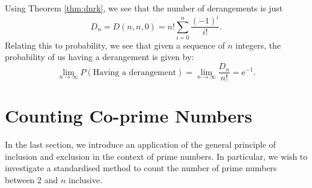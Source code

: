\documentclass[math]{amznotes}
\theoremstyle{remark}
\begin{document}
Using Theorem \ref{thm:dnrk}, we see that the number of derangements is just
\begin{equation*}
    D_n = D(n, n, 0) = n!\sum_{i = 0}^{n}\frac{(-1)^i}{i!}.
\end{equation*}
Relating this to probability, we see that given a sequence of $n$ integers, the probability of us having a derangement is given by:
\begin{equation*}
    \lim_{n \to \infty}P(\textrm{Having a derangement}) = \lim_{n \to \infty}\frac{D_n}{n!} = \mathrm{e}^{-1}.
\end{equation*}

\section{Counting Co-prime Numbers}
In the last section, we introduce an application of the general principle of inclusion and exclusion in the context of prime numbers. In particular, we wish to investigate a standardised method to count the number of prime numbers between $2$ and $n$ inclusive.
\end{document}
